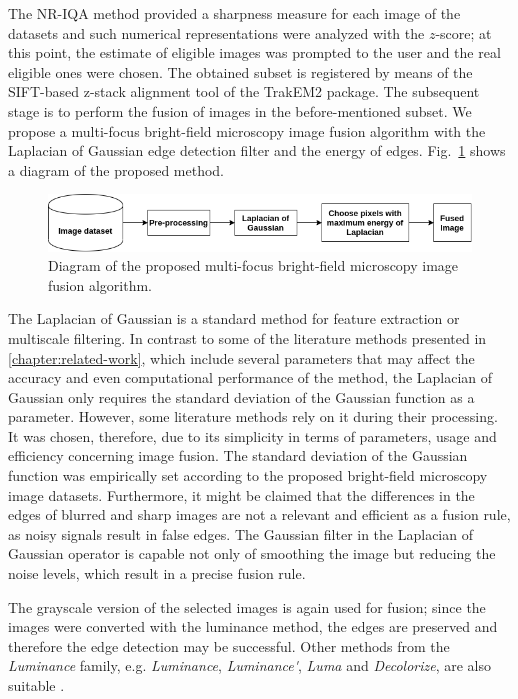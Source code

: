 The NR-IQA method provided a sharpness measure for each image of the datasets and such numerical representations were analyzed with the $z$-score; at this point, the estimate of eligible images was prompted to the user and the real eligible ones were chosen. The obtained subset is registered by means of the SIFT-based z-stack alignment tool of the TrakEM2 package. The subsequent stage is to perform the fusion of images in the before-mentioned subset. We propose a multi-focus bright-field microscopy image fusion algorithm with the Laplacian of Gaussian edge detection filter and the energy of edges. Fig.~\ref{fig:fusion_pipeline} shows a diagram of the proposed method.

\begin{figure}[ht]
    \centering
    \caption{Diagram of the proposed multi-focus bright-field microscopy image fusion algorithm.}
    \label{fig:fusion_pipeline}
    \includegraphics[scale=0.65]{images/fusion_pipeline.png}
    \centering
    \fautor
\end{figure}

The Laplacian of Gaussian is a standard method for feature extraction or multiscale filtering. In contrast to some of the literature methods presented in \autoref{chapter:related-work}, which include several parameters that may affect the accuracy and even computational performance of the method, the Laplacian of Gaussian only requires the standard deviation of the Gaussian function as a parameter. However, some literature methods rely on it during their processing. It was chosen, therefore, due to its simplicity in terms of parameters, usage and efficiency concerning image fusion. The standard deviation of the Gaussian function was empirically set according to the proposed bright-field microscopy image datasets. Furthermore, it might be claimed that the differences in the edges of blurred and sharp images are not a relevant and efficient as a fusion rule, as noisy signals result in false edges. The Gaussian filter in the Laplacian of Gaussian operator is capable not only of smoothing the image but reducing the noise levels, which result in a precise fusion rule.

The grayscale version of the selected images is again used for fusion; since the images were converted with the luminance method, the edges are preserved and therefore the edge detection may be successful. Other methods from the \emph{Luminance} family, e.g. \emph{Luminance}, \emph{Luminance\'}, \emph{Luma} and \emph{Decolorize}, are also suitable \cite{kanan2012color}. 

